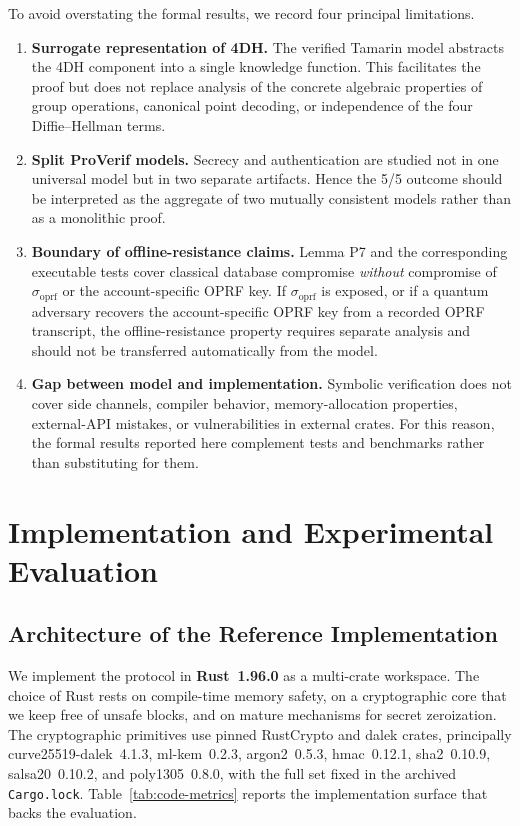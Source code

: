 \documentclass[preprint,12pt]{elsarticle}
\newcommand{\sigoprf}{\sigma_{\mathrm{oprf}}}
\newcommand{\codeid}[1]{\textsf{#1}}
\theoremstyle{remark}
\begin{document}
To avoid overstating the formal results, we record four principal limitations.
\begin{enumerate}
  \item \textbf{Surrogate representation of 4DH.} The verified Tamarin
        model abstracts the 4DH component into a single knowledge
        function. This facilitates the proof but does not replace
        analysis of the concrete algebraic properties of group
        operations, canonical point decoding, or independence of the
        four Diffie--Hellman terms.
  \item \textbf{Split ProVerif models.} Secrecy and authentication are
        studied not in one universal model but in two separate
        artifacts. Hence the 5/5 outcome should be interpreted as the
        aggregate of two mutually consistent models rather than as a
        monolithic proof.
  \item \textbf{Boundary of offline-resistance claims.} Lemma P7 and the
        corresponding executable tests cover classical database compromise
        \emph{without} compromise of $\sigoprf$ or the account-specific OPRF
        key. If $\sigoprf$ is exposed, or if a quantum adversary recovers the
        account-specific OPRF key from a recorded OPRF transcript, the
        offline-resistance property requires separate analysis and
        should not be transferred automatically from the model.
  \item \textbf{Gap between model and implementation.} Symbolic
        verification does not cover side channels, compiler behavior,
        memory-allocation properties, external-API mistakes, or
        vulnerabilities in external crates. For this reason, the formal
        results reported here complement tests and benchmarks rather than
        substituting for them.
\end{enumerate}

\section{Implementation and Experimental Evaluation}

\subsection{Architecture of the Reference Implementation}

We implement the protocol in \textbf{Rust~1.96.0} as a multi-crate
workspace. The choice of Rust rests on compile-time memory safety, on a
cryptographic core that we keep free of \codeid{unsafe} blocks, and on
mature mechanisms for secret zeroization. The cryptographic primitives use
pinned RustCrypto and dalek crates, principally \codeid{curve25519-dalek}~4.1.3,
\codeid{ml-kem}~0.2.3, \codeid{argon2}~0.5.3, \codeid{hmac}~0.12.1,
\codeid{sha2}~0.10.9, \codeid{salsa20}~0.10.2, and \codeid{poly1305}~0.8.0, with
the full set fixed in the archived \texttt{Cargo.lock}.
Table~\ref{tab:code-metrics} reports the implementation surface that
backs the evaluation.
\end{document}
